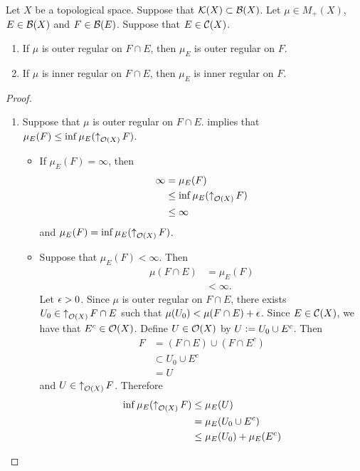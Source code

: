 \documentclass{book}
\begin{document}
	\begin{ex}
		Let $X$ be a topological space. Suppose that $\mathcal{K}(X) \subset \mathcal{B}(X)$. Let $\mu \in M_+(X)$, $E \in \mathcal{B}(X)$ and $F \in \mathcal{B}(E)$. Suppose that $E \in \mathcal{C}(X)$. 
		\begin{enumerate}
			\item If $\mu$ is outer regular on $F \cap E$, then $\mu_E$ is outer regular on $F$.
			\item If $\mu$ is inner regular on $F \cap E$, then $\mu_E$ is inner regular on $F$. 
		\end{enumerate}
	\end{ex}
	
	\begin{proof}\
		\begin{enumerate}
			\item Suppose that $\mu$ is outer regular on $F \cap E$.  implies that $\mu_E(F) \leq \inf \mu_E(\operatorname{\uparrow}_{\mathcal{O}(X)}F)$.
			\begin{itemize}
				\item If $\mu_E(F) = \infty$, then 
				\begin{align*}
					\infty 
					& = \mu_E(F) \\
					& \leq \inf \mu_E(\operatorname{\uparrow}_{\mathcal{O}(X)}F) \\
					& \leq \infty 
				\end{align*}
				and $\mu_E(F) = \inf \mu_E(\operatorname{\uparrow}_{\mathcal{O}(X)}F)$.
				\item Suppose that $\mu_E(F) < \infty$. Then  
				\begin{align*}
					\mu(F \cap E)
					& = \mu_E(F) \\
					& < \infty.
				\end{align*}
				Let $\epsilon > 0$. Since $\mu$ is outer regular on $F \cap E$, there exists $U_0 \in \operatorname{\uparrow}_{\mathcal{O}(X)} F \cap E$ such that $\mu(U_0) < \mu(F \cap E) + \epsilon$. Since $E \in \mathcal{C}(X)$, we have that $E^c \in \mathcal{O}(X)$. Define $U \in \mathcal{O}(X)$ by $U \vcentcolon= U_0 \cup E^c$. Then 
				\begin{align*}
					F
					& = (F \cap E) \cup (F \cap E^c) \\
					& \subset U_0 \cup E^c \\
					& = U
				\end{align*}
				and $U \in \operatorname{\uparrow}_{\mathcal{O}(X)} F$. Therefore
				\begin{align*}
					\inf \mu_E( \upar_{\MO(X)} F)
					& \leq \mu_E(U) \\
					& = \mu_E(U_0 \cup E^c) \\
					& \leq \mu_E(U_0) + \mu_E(E^c) \\

\end{align*}
\end{itemize}
\end{enumerate}
\end{proof}
\end{document}
